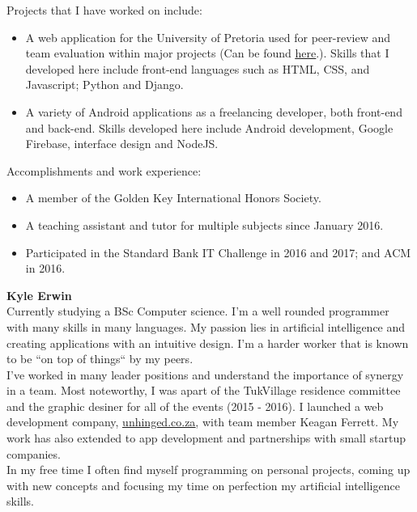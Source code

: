     \noindent
    Projects that I have worked on include:
    \begin{itemize}
        \item A web application for the University of Pretoria used for peer-review and team evaluation within major projects (Can be found \href{https://github.com/teampinocchio/pinocchio/wiki}{\underline{here}}.). Skills that I developed here include front-end languages such as HTML, CSS, and Javascript; Python and Django.
    
        \item A variety of Android applications as a freelancing developer, both front-end and back-end. Skills developed here include Android development, Google Firebase, interface design and NodeJS.
    \end{itemize}
    
    \noindent
	Accomplishments and work experience:
    \begin{itemize}
        \item A member of the Golden Key International Honors Society.
        \item A teaching assistant and tutor for multiple subjects since January 2016.
        \item Participated in the Standard Bank IT Challenge in 2016 and 2017; and ACM in 2016.
    \end{itemize}

\textbf{Kyle Erwin}\\
	Currently studying a BSc Computer science. I'm a well rounded programmer with many skills in many languages. My passion lies in artificial intelligence and creating applications with an intuitive design. I'm a harder worker that is known to be ``on top of things`` by my peers. \\ 

	I've worked in many leader positions and understand the importance of synergy in a team. Most noteworthy, I was apart of the TukVillage residence committee and the graphic desiner for all of the events (2015 - 2016). I launched a web development company, \href{www.unhinged.co.za}{\underline{unhinged.co.za}}, with team member Keagan Ferrett. My work has also extended to app development and partnerships with small startup companies.\\

	In my free time I often find myself programming on personal projects, coming up with new concepts and focusing my time on perfection my artificial intelligence skills. 

